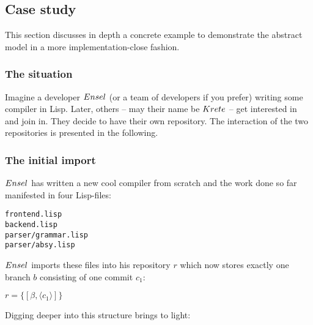 \documentclass[fleqn, 10pt, a4paper]{article}
\begin{document}
\subsection{Case study}

This section discusses in depth a concrete example to demonstrate the
abstract model in a more implementation-close fashion.

\subsubsection{The situation}

Imagine a developer $\mathnormal{Ensel}$ (or a team of developers
if you prefer) writing
some compiler in Lisp. Later, others --
may their name be $\mathnormal{Krete}$ -- get interested in and join in.
They decide to have their own repository. The interaction of the two
repositories is presented in the following.

\subsubsection{The initial import}

$\mathnormal{Ensel}$ has written a new cool compiler from scratch
and the work done so far manifested in four Lisp-files:

\begin{verbatim}
frontend.lisp
backend.lisp
parser/grammar.lisp
parser/absy.lisp
\end{verbatim}

$\mathnormal{Ensel}$ imports these files into his repository $r$ which
now stores exactly one branch $b$ consisting of one commit $c_1$:

$r=\{[\beta, \langle c_1\rangle]\}$

Digging deeper into this structure brings to light:
\end{document}
